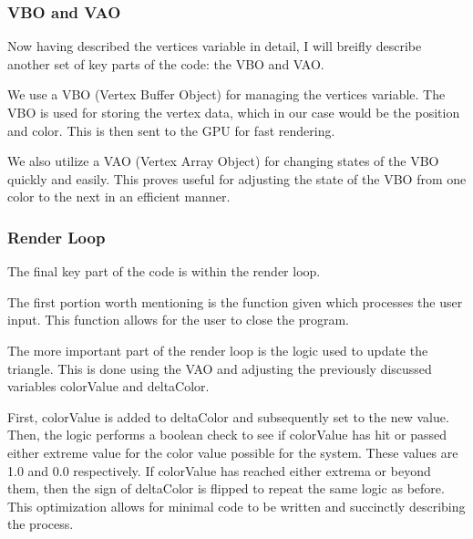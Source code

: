 \subsubsection{VBO and VAO}

Now having described the vertices variable in detail, I will breifly describe another set of key parts of the code: the VBO and VAO.

We use a VBO (Vertex Buffer Object) for managing the vertices variable.
The VBO is used for storing the vertex data, which in our case would be the position and color.
This is then sent to the GPU for fast rendering.

We also utilize a VAO (Vertex Array Object) for changing states of the VBO quickly and easily.
This proves useful for adjusting the state of the VBO from one color to the next in an efficient manner.

\subsubsection{Render Loop}

The final key part of the code is within the render loop.

The first portion worth mentioning is the function given which processes the user input.
This function allows for the user to close the program.

The more important part of the render loop is the logic used to update the triangle.
This is done using the VAO and adjusting the previously discussed variables colorValue and deltaColor.

First, colorValue is added to deltaColor and subsequently set to the new value.
Then, the logic performs a boolean check to see if colorValue has hit or passed either extreme value for the color value possible for the system.
These values are 1.0 and 0.0 respectively.
If colorValue has reached either extrema or beyond them, then the sign of deltaColor is flipped to repeat the same logic as before.
This optimization allows for minimal code to be written and succinctly describing the process.


